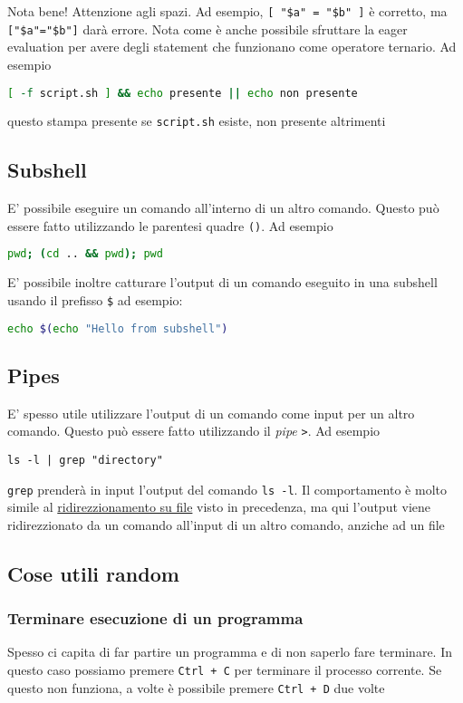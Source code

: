 Nota bene! Attenzione agli spazi. Ad esempio, \verb|[ "$a" = "$b" ]| è corretto, ma \verb|["$a"="$b"]| darà errore.
\vskip3mm
Nota come è anche possibile sfruttare la eager evaluation per avere degli statement che funzionano come operatore ternario. Ad esempio
\begin{lstlisting}[language = bash]
[ -f script.sh ] && echo presente || echo non presente
\end{lstlisting}
questo stampa presente se \verb|script.sh| esiste, non presente altrimenti
\subsection{Subshell}
E' possibile eseguire un comando all'interno di un altro comando. Questo può essere fatto utilizzando le parentesi quadre \verb|()|. Ad esempio
\begin{lstlisting}[language = bash]
pwd; (cd .. && pwd); pwd
\end{lstlisting}
E' possibile inoltre catturare l'output di un comando eseguito in una subshell usando il prefisso \verb|$| ad esempio:
\begin{lstlisting}[language = bash]
echo $(echo "Hello from subshell")
\end{lstlisting}

\subsection{Pipes}
E' spesso utile utilizzare l'output di un comando come input per un altro comando. Questo può essere fatto utilizzando il \textit{pipe} \verb|>|. Ad esempio
\begin{center}
	\texttt{ls -l | grep "directory"}
\end{center}
\verb|grep| prenderà in input l'output del comando \verb|ls -l|. Il comportamento è molto simile al \hyperref[shell indirection]{ridirezzionamento su file} visto in precedenza, ma qui l'output viene ridirezzionato da un comando all'input di un altro comando, anziche ad un file

\subsection{Cose utili random}
\subsubsection*{Terminare esecuzione di un programma}
Spesso ci capita di far partire un programma e di non saperlo fare terminare. In questo caso possiamo premere \verb|Ctrl + C| per terminare il processo corrente.
\vskip3mm
Se questo non funziona, a volte è possibile premere \verb|Ctrl + D| due volte
